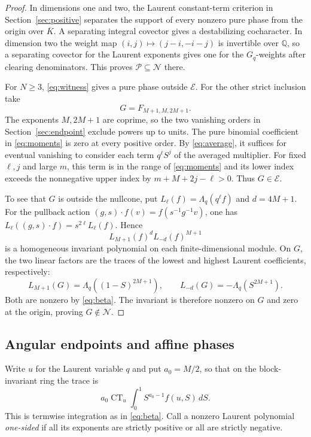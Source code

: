 \documentclass[11pt]{article}
\newcommand{\CT}{\operatorname{CT}}
\newcommand{\Lq}{\Lambda_q}
\begin{document}
\begin{proof}
In dimensions one and two, the Laurent constant-term criterion in
Section~\ref{sec:positive} separates the support of every nonzero
pure phase from the origin over \(\overline K\). A separating
integral covector gives a destabilizing cocharacter. In dimension
two the weight map \((i,j)\mapsto(j-i,-i-j)\) is invertible over
\(\mathbb Q\), so a separating covector for the Laurent exponents
gives one for the \(G_q\)-weights after clearing denominators.
This proves \(\mathcal P\subseteq\mathcal N\) there.

For \(N\ge3\), \eqref{eq:witness} gives a pure phase outside
\(\mathcal E\). For the other strict inclusion take
\[
             G=F_{M+1,M,2M+1}.
\]
The exponents \(M,2M+1\) are coprime, so the two vanishing orders
in Section~\ref{sec:endpoint} exclude powers up to units.
The pure binomial coefficient in \eqref{eq:moments} is zero at
every positive order. By \eqref{eq:average}, it suffices for eventual
vanishing to consider each term \(q^\ell S^j\) of the averaged
multiplier. For fixed \(\ell,j\) and large \(m\), this term is in
the range of \eqref{eq:moments} and its lower index exceeds the
nonnegative upper index by \(m+M+2j-\ell>0\). Thus \(G\in\mathcal E\).

To see that \(G\) is outside the nullcone, put
\(L_\ell(f)=\Lq(q^\ell f)\) and \(d=4M+1\).
For the pullback action \((g,s)\cdot f(v)=f(s^{-1}g^{-1}v)\),
one has \(L_\ell((g,s)\cdot f)=s^{2\ell}L_\ell(f)\).
Hence
\[
           L_{M+1}(f)^d L_{-d}(f)^{M+1}
\]
is a homogeneous invariant polynomial on each finite-dimensional
module. On \(G\), the two linear factors are the traces of the
lowest and highest Laurent coefficients, respectively:
\[
         L_{M+1}(G)=\Lq((1-S)^{2M+1}), \qquad
         L_{-d}(G)=-\Lq(S^{2M+1}).
\]
Both are nonzero by \eqref{eq:beta}. The invariant is therefore
nonzero on \(G\) and zero at the origin, proving
\(G\notin\mathcal N\).
\end{proof}

\subsection*{Angular endpoints and affine phases}

Write \(u\) for the Laurent variable \(q\) and put \(a_0=M/2\),
so that on the block-invariant ring the trace is
\[
   a_0\CT_u\int_0^1 S^{a_0-1} f(u,S)\,dS.
\]
This is termwise integration as in \eqref{eq:beta}.
Call a nonzero Laurent polynomial \emph{one-sided} if all its
exponents are strictly positive or all are strictly negative.
\end{document}
